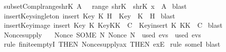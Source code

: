 \begin{isabellebody}
  {\isafoldproof}%
  \isadelimproof
  \isanewline
  \endisadelimproof
  \isanewline
  \isamarkupfalse%
  \ subset{\isacharunderscore}Compl{\isacharunderscore}range{\isacharunderscore}shrK{\isacharcolon}\ {\isachardoublequoteopen}A\ {\isasymsubseteq}\ {\isacharminus}\ {\isacharparenleft}range\ shrK{\isacharparenright}\ {\isasymLongrightarrow}\ shrK\ x\ {\isasymnotin}\ A{\isachardoublequoteclose}\isanewline
  \isadelimproof
  \endisadelimproof
  \isatagproof
  \isamarkupfalse%
  \ blast%
  \endisatagproof
  {\isafoldproof}%
  \isadelimproof
  \isanewline
  \endisadelimproof
  \isanewline
  \isamarkupfalse%
  \ insert{\isacharunderscore}Key{\isacharunderscore}singleton{\isacharcolon}\ {\isachardoublequoteopen}insert\ {\isacharparenleft}Key\ K{\isacharparenright}\ H\ {\isacharequal}\ Key\ {\isacharbackquote}\ {\isacharbraceleft}K{\isacharbraceright}\ {\isasymunion}\ H{\isachardoublequoteclose}\isanewline
  \isadelimproof
  \endisadelimproof
  \isatagproof
  \isamarkupfalse%
  \ blast%
  \endisatagproof
  {\isafoldproof}%
  \isadelimproof
  \isanewline
  \endisadelimproof
  \isanewline
  \isamarkupfalse%
  \ insert{\isacharunderscore}Key{\isacharunderscore}image{\isacharcolon}\ {\isachardoublequoteopen}insert\ {\isacharparenleft}Key\ K{\isacharparenright}\ {\isacharparenleft}Key{\isacharbackquote}KK\ {\isasymunion}\ C{\isacharparenright}\ {\isacharequal}\ Key{\isacharbackquote}{\isacharparenleft}insert\ K\ KK{\isacharparenright}\ {\isasymunion}\ C{\isachardoublequoteclose}\isanewline
  \isadelimproof
  \endisadelimproof
  \isatagproof
  \isamarkupfalse%
  \ blast%
  \endisatagproof
  {\isafoldproof}%
  \isadelimproof
  \isanewline
  \endisadelimproof
  \isanewline
  \isanewline
  \isamarkupfalse%
  \ Nonce{\isacharunderscore}supply\ {\isacharcolon}\isanewline
  \ \ {\isachardoublequoteopen}Nonce\ {\isacharparenleft}SOME\ N{\isachardot}\ Nonce\ N\ {\isasymnotin}\ used\ evs{\isacharparenright}\ {\isasymnotin}\ used\ evs{\isachardoublequoteclose}\isanewline
  \isadelimproof
  \endisadelimproof
  \isatagproof
  \isamarkupfalse%
  \ {\isacharparenleft}rule\ finite{\isachardot}emptyI\ {\isacharbrackleft}THEN\ Nonce{\isacharunderscore}supply{\isacharunderscore}ax{\isacharcomma}\ THEN\ exE{\isacharbrackright}{\isacharparenright}\isanewline
  \isamarkupfalse%
  \ {\isacharparenleft}rule\ someI{\isacharcomma}\ blast{\isacharparenright}\isanewline

\end{isabellebody}
